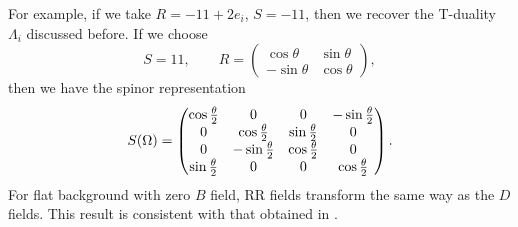 \documentclass[a4paper,12pt]{article}
\begin{document}
For example, if we take $R=-1\!\!1 +2 e_i$, $S=-1\!\!1$,
then we recover the T-duality $\Lambda_i$ discussed before.
If we choose \cite{hassan99}
$$S=1\!\!1,\qquad R=\begin{pmatrix}
\cos\theta & \sin\theta\\
-\sin\theta & \cos\theta
\end{pmatrix},$$
then we have the spinor representation
\begin{equation}
\label{soluex1b}
S(\Omega)=\begin{pmatrix}
\cos{\theta\over 2} & 0 & 0 &-\sin{\theta\over 2}\\
0 & \cos{\theta\over 2} & \sin{\theta\over 2}& 0 \\
0 & -\sin{\theta\over 2} & \cos{\theta\over 2} & 0 \\
\sin{\theta\over 2} & 0 & 0 & \cos{\theta\over 2}
\end{pmatrix}.
\end{equation}
For flat background with zero $B$ field, RR
fields transform the same way as the $D$ fields.
This result is consistent with that obtained
in \cite{hassan99}.
\end{document}
